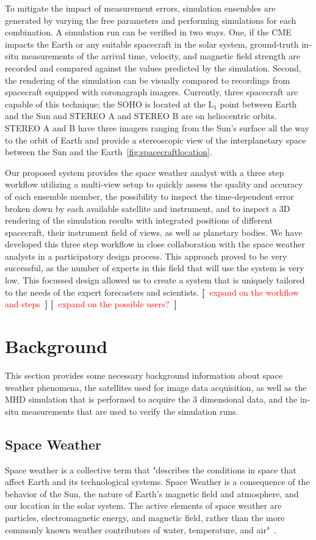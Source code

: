 \documentclass[journal]{vgtc}                %
\newcommand{\todo}[1] {\textbf{[~}\textcolor {red}{#1}\marginpar{\textcolor {red}{\centerline{{\Huge \textbf{!}}}}}\textbf{~]}}
\newcommand{\todo}[1] {\textbf{[~}\textcolor {red}{#1}\marginpar{\textcolor {red}{\centerline{{\Huge \textbf{!}}}}}\textbf{~]}}
\begin{document}
To mitigate the impact of measurement errors, simulation ensembles are generated by varying the free parameters and performing simulations for each combination. A simulation run can be verified in two ways. One, if the CME impacts the Earth or any suitable spacecraft in the solar system, ground-truth in-situ measurements of the arrival time, velocity, and magnetic field strength are recorded and compared against the values predicted by the simulation. Second, the rendering of the simulation can be visually compared to recordings from spacecraft equipped with coronagraph imagers. Currently, three spacecraft are capable of this technique; the SOHO is located at the L$_1$ point between Earth and the Sun and STEREO A and STEREO B are on heliocentric orbits. STEREO A and B have three imagers ranging from the Sun's surface all the way to the orbit of Earth and provide a stereoscopic view of the interplanetary space between the Sun and the Earth~\ref{fig:spacecraftlocation}.

Our proposed system provides the space weather analyst with a three step workflow utilizing a multi-view setup to quickly assess the quality and accuracy of each ensemble member, the possibility to inspect the time-dependent error broken down by each available satellite and instrument, and to inspect a 3D rendering of the simulation results with integrated positions of different spacecraft, their instrument field of views, as well as planetary bodies. We have developed this three step workflow in close collaboration with the space weather analysts in a participatory design process. This approach proved to be very successful, as the number of experts in this field that will use the system is very low. This focussed design allowed us to create a system that is uniquely tailored to the needs of the expert forecasters and scientists. \todo{expand on the workflow and steps} \todo{expand on the possible users?}

\section{Background}
This section provides some necessary background information about space weather phenomena, the satellites used for image data acquisition, as well as the MHD simulation that is performed to acquire the 3 dimensional data, and the in-situ measurements that are used to verify the simulation runs.

\subsection{Space Weather}
Space weather is a collective term that "describes the conditions in space that affect Earth and its technological systems. Space Weather is a consequence of the behavior of the Sun, the nature of Earth’s magnetic field and atmosphere, and our location in the solar system. The active elements of space weather are particles, electromagnetic energy, and magnetic field, rather than the more commonly known weather contributors of water, temperature, and air"~\cite{noaaprofile}.
\end{document}
